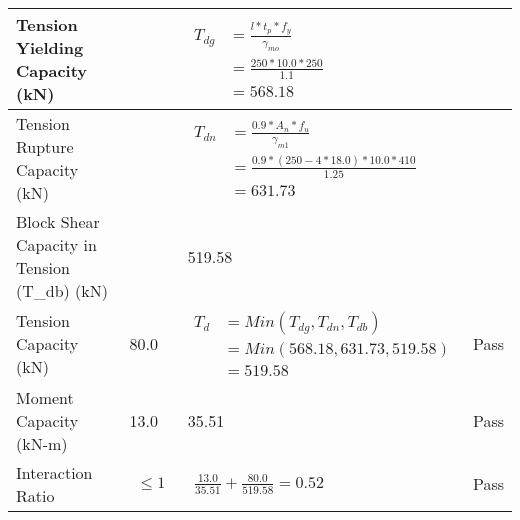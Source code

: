 \documentclass{article}%
\begin{document}
\begin{longtable}{|p{4cm}|p{5cm}|p{5.5cm}|p{1.5cm}|}
\hline%
Tension Yielding Capacity (kN)&&$\begin{aligned} T_{dg} &= \frac{l*t_p*f_y}{\gamma_{mo}}\\ &=\frac{250*10.0*250}{1.1}\\ &=568.18\end{aligned}$&\\%
\hline%
Tension Rupture Capacity (kN)&&$\begin{aligned} T_{dn} &= \frac{0.9*A_{n}*f_u}{\gamma_{m1}}\\ &=\frac{0.9*(250-4*18.0)*10.0*410}{1.25}\\ &=631.73\end{aligned}$&\\%
\hline%
Block Shear Capacity in Tension (T\_db) (kN)&&519.58&\\%
\hline%
Tension Capacity (kN)&80.0&$\begin{aligned} T_d &= Min(T_{dg},T_{dn},T_{db})\\ &= Min(568.18,631.73,519.58)\\ &=519.58\end{aligned}$&Pass\\%
\hline%
Moment Capacity (kN{-}m)&13.0&35.51&Pass\\%
\hline%
Interaction Ratio&$\begin{aligned} \leq1\end{aligned}$&$\begin{aligned} \frac{13.0}{35.51}+\frac{80.0}{519.58}=0.52\end{aligned}$&Pass\\%
\hline%
\end{longtable}

%
\newpage%
\end{document}
